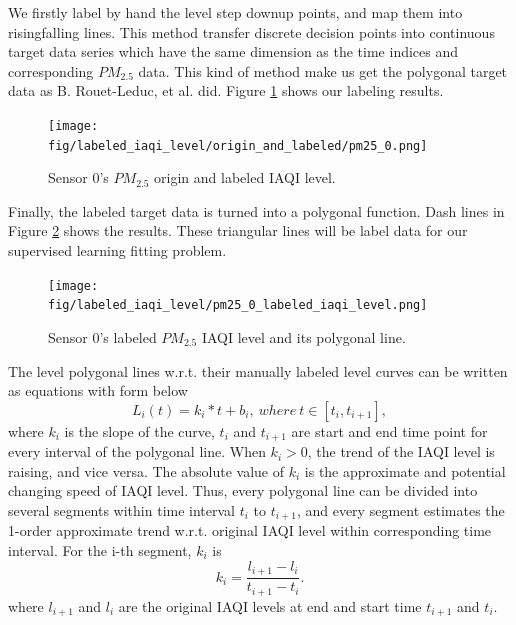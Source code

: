 \documentclass[sigconf]{acmart}
\begin{document}
We firstly label by hand the level step down\/up points, and map them into rising\/falling lines. This method transfer discrete decision points into continuous target data series which have the same dimension as the time indices and corresponding $PM_{2.5}$ data. This kind of method make us get the polygonal target data as B. Rouet-Leduc, et al. \cite{rouet2017machine} did. Figure \ref{fig:pm25_0_origin_and_labeled_level} shows our labeling results.

\begin{figure}[!htbp]
    \begin{center}
        \texttt{[image: fig/labeled\_iaqi\_level/origin\_and\_labeled/pm25\_0.png]}
        \caption{Sensor 0's $PM_{2.5}$ origin and labeled IAQI level.}
        \label{fig:pm25_0_origin_and_labeled_level}
    \end{center}
\end{figure}


Finally, the labeled target data is turned into a polygonal function. Dash lines in Figure \ref{fig:pm25_0_labeled_level} shows the results. These triangular lines will be label data for our supervised learning fitting problem.

\begin{figure}[!htbp]
    \centering
    \texttt{[image: fig/labeled\_iaqi\_level/pm25\_0\_labeled\_iaqi\_level.png]}
    \caption{Sensor 0's labeled $PM_{2.5}$ IAQI level and its polygonal line.}
    \label{fig:pm25_0_labeled_level}
\end{figure}

The level polygonal lines w.r.t. their manually labeled level curves can be written as equations with form below
\begin{equation}
    \label{formula:polygonal}
    L_i(t)=k_i*t+b_i,\ where\ t\in[t_i,t_{i+1}],
\end{equation}
where $k_i$ is the slope of the curve, $t_i$ and $t_{i+1}$ are start and end time point for every interval of the polygonal line. When $k_i>0$, the trend of the IAQI level is raising, and vice versa. The absolute value of $k_i$ is the approximate and potential changing speed of IAQI level. Thus, every polygonal line can be divided into several segments within time interval $t_i$ to $t_{i+1}$, and every segment estimates the 1-order approximate trend w.r.t. original IAQI level within corresponding time interval. For the i-th segment, $k_i$ is
\begin{equation}
    k_i = \frac{l_{i+1}-l_i}{t_{i+1}-t_i}.
\end{equation}
where $l_{i+1}$ and $l_i$ are the original IAQI levels at end and start time $t_{i+1}$ and $t_i$.
\end{document}
